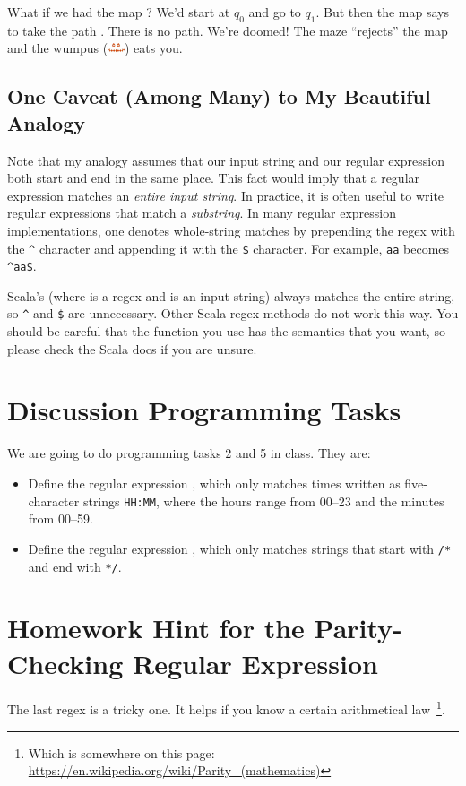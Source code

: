 \documentclass[9pt]{extbook}
\begin{document}
What if we had the map ?  We'd start at $q_0$ and go to $q_1$.  But then the map says to take the path .  There is no  path.  We're doomed! The maze ``rejects'' the map and the wumpus (\includegraphics[width=0.5cm]{wumpus.jpg}) eats you.

\subsection{One Caveat (Among Many) to My Beautiful Analogy}

Note that my analogy assumes that our input string and our regular expression both start and end in the same place.  This fact would imply that a regular expression matches an \emph{entire input string}.  In practice, it is often useful to write regular expressions that match a \emph{substring}.  In many regular expression implementations, one denotes whole-string matches by prepending the regex with the \texttt{\^{}} character and appending it with the \texttt{\$} character.  For example, \texttt{aa} becomes \texttt{\^{}aa\$}.

Scala's  (where  is a regex and  is an input string) always matches the entire string, so \texttt{\^{}} and \texttt{\$} are unnecessary.  Other Scala regex methods do not work this way.  You should be careful that the function you use has the semantics that you want, so please check the Scala docs if you are unsure.

\section{Discussion Programming Tasks}

We are going to do programming tasks 2 and 5 in class.  They are:

\begin{itemize}

  \item Define the regular expression , which only matches times written as five-character strings \texttt{HH:MM}, where the hours range from 00--23 and the minutes from 00--59.
 
  \item Define the regular expression , which only matches strings that start with \texttt{/*} and end with \texttt{*/}.

\end{itemize}

\section{Homework Hint for the Parity-Checking Regular Expression}

The last regex is a tricky one.  It helps if you know a certain arithmetical law~\footnote{Which is somewhere on this page: \url{https://en.wikipedia.org/wiki/Parity_(mathematics)}}.
\end{document}
